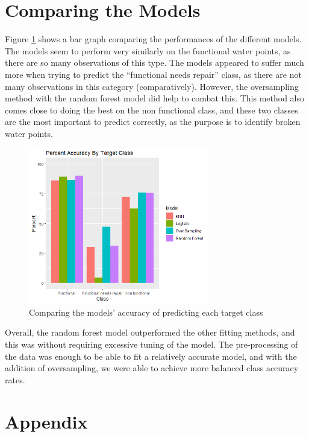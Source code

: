 \documentclass{article}
\begin{document}
\section{Comparing the Models} \label{comparasion}
Figure \ref{fig:modelComp} shows a bar graph comparing the performances of the different models.  The models seem to perform very similarly on the functional water points, as there are so many observations of this type.  The models appeared to suffer much more when trying to predict the ``functional needs repair'' class, as there are not many observations in this  category (comparatively).  However, the oversampling method with the random forest model did help to combat this. This method also comes close to doing the best on the non functional class, and these two classes are the most important to predict correctly, as the purpose is to identify broken water points.

\begin{figure}[!h]
    \centering
    \includegraphics[width = 0.7\textwidth]{Figures/percentAccuracyByClass.png}
    \caption{Comparing the models' accuracy of predicting each target class}
    \label{fig:modelComp}
\end{figure}

Overall, the random forest model outperformed the other fitting methods, and this was without requiring excessive tuning of the model.  The pre-processing of the data was enough to be able to fit a relatively accurate model, and with the addition of oversampling, we were able to achieve more balanced class accuracy rates.

\newpage
\section{Appendix}



\end{document}
